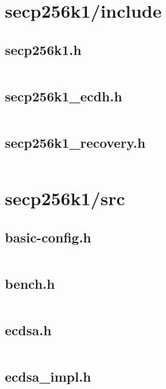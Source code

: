 \documentclass{article}
\begin{document}
\section{secp256k1/include}

\subsection{secp256k1.h}
\inputminted{cpp}{/home/dufferzafar/dev/@clones/bitcoin/src/secp256k1/include/secp256k1.h}
\newpage

\subsection{secp256k1\_ecdh.h}
\inputminted{cpp}{/home/dufferzafar/dev/@clones/bitcoin/src/secp256k1/include/secp256k1_ecdh.h}
\newpage

\subsection{secp256k1\_recovery.h}
\inputminted{cpp}{/home/dufferzafar/dev/@clones/bitcoin/src/secp256k1/include/secp256k1_recovery.h}
\newpage

\section{secp256k1/src}

\subsection{basic-config.h}
\inputminted{cpp}{/home/dufferzafar/dev/@clones/bitcoin/src/secp256k1/src/basic-config.h}
\newpage

\subsection{bench.h}
\inputminted{cpp}{/home/dufferzafar/dev/@clones/bitcoin/src/secp256k1/src/bench.h}
\newpage

\subsection{ecdsa.h}
\inputminted{cpp}{/home/dufferzafar/dev/@clones/bitcoin/src/secp256k1/src/ecdsa.h}
\newpage

\subsection{ecdsa\_impl.h}
\inputminted{cpp}{/home/dufferzafar/dev/@clones/bitcoin/src/secp256k1/src/ecdsa_impl.h}
\newpage
\end{document}
